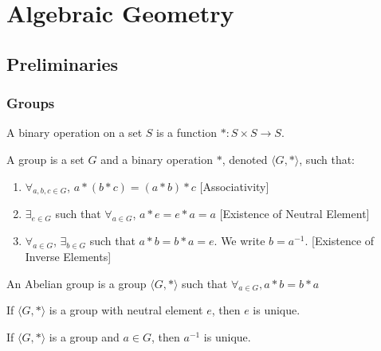 \documentclass[crop=false,class=article,oneside]{standalone}
\begin{document}
    \ifx\ifmathcoursesalgebraicgeometry\undefined
        \section*{Algebraic Geometry}
        \setcounter{section}{1}
    \fi
    \subsection{Preliminaries}
        \subsubsection{Groups}
            \begin{definition}
                A binary operation on a set $S$ is a
                function $*:S\times S \rightarrow S$.
            \end{definition}
            \begin{definition}
                A group is a set $G$ and a binary operation $*$,
                denoted $\langle G,*\rangle$, such that:
                \begin{enumerate}
                    \item $\forall_{a,b,c\in G}$, $a*(b*c)=(a*b)*c$
                          \hfill[Associativity]
                    \item $\exists_{e\in G}$ such that
                          $\forall_{a\in G}$, $a*e=e*a=a$
                          \hfill[Existence of Neutral Element]
                    \item $\forall_{a\in G}$, $\exists_{b\in G}$
                          such that $a*b=b*a=e$.
                          We write $b=a^{-1}$.
                          \hfill[Existence of Inverse Elements]
                \end{enumerate}
            \end{definition}
            \begin{definition}
                An Abelian group is a group $\langle G,*\rangle$
                such that $\forall_{a\in G},a*b=b*a$
            \end{definition}
            \begin{theorem}
                If $\langle G, *\rangle$ is a group with neutral
                element $e$, then $e$ is unique.
            \end{theorem}
            \begin{theorem}
                If $\langle G,*\rangle$ is a group and $a\in G$,
                then $a^{-1}$ is unique.
            \end{theorem}
\end{document}
